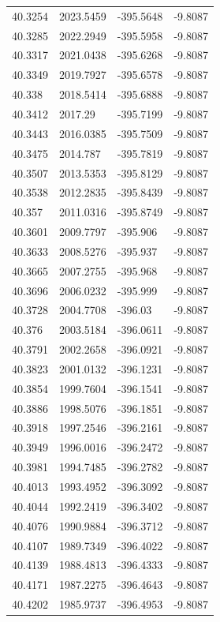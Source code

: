 \begin{table}[H]
\begin{tabular}{llll}
40.3254 & 2023.5459 & -395.5648 & -9.8087 \\
40.3285 & 2022.2949 & -395.5958 & -9.8087 \\
40.3317 & 2021.0438 & -395.6268 & -9.8087 \\
40.3349 & 2019.7927 & -395.6578 & -9.8087 \\
40.338 & 2018.5414 & -395.6888 & -9.8087 \\
40.3412 & 2017.29 & -395.7199 & -9.8087 \\
40.3443 & 2016.0385 & -395.7509 & -9.8087 \\
40.3475 & 2014.787 & -395.7819 & -9.8087 \\
40.3507 & 2013.5353 & -395.8129 & -9.8087 \\
40.3538 & 2012.2835 & -395.8439 & -9.8087 \\
40.357 & 2011.0316 & -395.8749 & -9.8087 \\
40.3601 & 2009.7797 & -395.906 & -9.8087 \\
40.3633 & 2008.5276 & -395.937 & -9.8087 \\
40.3665 & 2007.2755 & -395.968 & -9.8087 \\
40.3696 & 2006.0232 & -395.999 & -9.8087 \\
40.3728 & 2004.7708 & -396.03 & -9.8087 \\
40.376 & 2003.5184 & -396.0611 & -9.8087 \\
40.3791 & 2002.2658 & -396.0921 & -9.8087 \\
40.3823 & 2001.0132 & -396.1231 & -9.8087 \\
40.3854 & 1999.7604 & -396.1541 & -9.8087 \\
40.3886 & 1998.5076 & -396.1851 & -9.8087 \\
40.3918 & 1997.2546 & -396.2161 & -9.8087 \\
40.3949 & 1996.0016 & -396.2472 & -9.8087 \\
40.3981 & 1994.7485 & -396.2782 & -9.8087 \\
40.4013 & 1993.4952 & -396.3092 & -9.8087 \\
40.4044 & 1992.2419 & -396.3402 & -9.8087 \\
40.4076 & 1990.9884 & -396.3712 & -9.8087 \\
40.4107 & 1989.7349 & -396.4022 & -9.8087 \\
40.4139 & 1988.4813 & -396.4333 & -9.8087 \\
40.4171 & 1987.2275 & -396.4643 & -9.8087 \\
40.4202 & 1985.9737 & -396.4953 & -9.8087 \\

\end{tabular}
\end{table}
